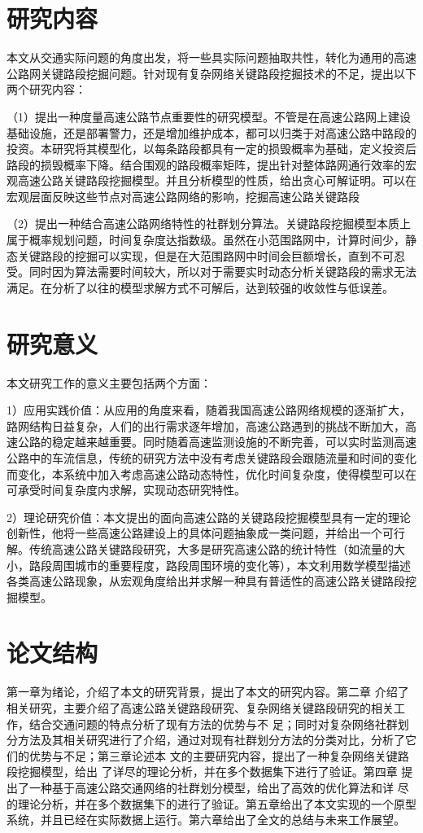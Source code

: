 \section{研究内容}
    本文从交通实际问题的角度出发，将一些具实际问题抽取共性，转化为通用的高速公路网关键路段挖掘问题。针对现有复杂网络关键路段挖掘技术的不足，提出以下两个研究内容：
    
		（1）提出一种度量高速公路节点重要性的研究模型。不管是在高速公路网上建设基础设施，还是部署警力，还是增加维护成本，都可以归类于对高速公路中路段的投资。本研究将其模型化，以每条路段都具有一定的损毁概率为基础，定义投资后路段的损毁概率下降。结合围观的路段概率矩阵，提出针对整体路网通行效率的宏观高速公路关键路段挖掘模型。并且分析模型的性质，给出贪心可解证明。可以在宏观层面反映这些节点对高速公路网络的影响，挖掘高速公路关键路段
		
		（2）提出一种结合高速公路网络特性的社群划分算法。关键路段挖掘模型本质上属于概率规划问题，时间复杂度达指数级。虽然在小范围路网中，计算时间少，静态关键路段的挖掘可以实现，但是在大范围路网中时间会巨额增长，直到不可忍受。同时因为算法需要时间较大，所以对于需要实时动态分析关键路段的需求无法满足。在分析了以往的模型求解方式不可解后，达到较强的收敛性与低误差。

\section{研究意义}
	本文研究工作的意义主要包括两个方面：

		1）应用实践价值：从应用的角度来看，随着我国高速公路网络规模的逐渐扩大，路网结构日益复杂，人们的出行需求逐年增加，高速公路遇到的挑战不断加大，高速公路的稳定越来越重要。同时随着高速监测设施的不断完善，可以实时监测高速公路中的车流信息，传统的研究方法中没有考虑关键路段会跟随流量和时间的变化而变化，本系统中加入考虑高速公路动态特性，优化时间复杂度，使得模型可以在可承受时间复杂度内求解，实现动态研究特性。

		2）理论研究价值：本文提出的面向高速公路的关键路段挖掘模型具有一定的理论创新性，他将一些高速公路建设上的具体问题抽象成一类问题，并给出一个可行解。传统高速公路关键路段研究，大多是研究高速公路的统计特性（如流量的大小，路段周围城市的重要程度，路段周围环境的变化等），本文利用数学模型描述各类高速公路现象，从宏观角度给出并求解一种具有普适性的高速公路关键路段挖掘模型。
		
\section{论文结构}
    第一章为绪论，介绍了本文的研究背景，提出了本文的研究内容。第二章
介绍了相关研究，主要介绍了高速公路关键路段研究、复杂网络关键路段研究的相关工作，结合交通问题的特点分析了现有方法的优势与不
足；同时对复杂网络社群划分方法及其相关研究进行了介绍，通过对现有社群划分方法的分类对比，分析了它们的优势与不足；第三章论述本
文的主要研究内容，提出了一种复杂网络关键路段挖掘模型，给出
了详尽的理论分析，并在多个数据集下进行了验证。第四章
提出了一种基于高速公路交通网络的社群划分模型，给出了高效的优化算法和详
尽的理论分析，并在多个数据集下的进行了验证。第五章给出了本文实现的一个原型系统，并且已经在实际数据上运行。第六章给出了全文的总结与未来工作展望。


